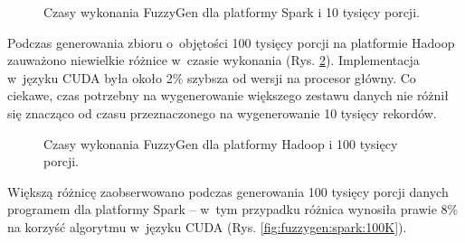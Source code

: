 \begin{figure}[h]
    \centering
    \caption{Czasy wykonania FuzzyGen dla platformy Spark i 10 tysięcy porcji.}
    \label{fig:fuzzygen:spark:10K}
\end{figure}

Podczas generowania zbioru o~objętości 100 tysięcy porcji na platformie Hadoop zauważono niewielkie
różnice w~czasie wykonania (Rys. \ref{fig:fuzzygen:hadoop:100K}). Implementacja w~języku CUDA była
około 2\% szybsza od wersji na procesor główny. Co ciekawe, czas potrzebny na wygenerowanie większego
zestawu danych nie różnił się znacząco od czasu przeznaczonego na wygenerowanie 10 tysięcy rekordów.

\begin{figure}[h!]
    \centering
    \caption{Czasy wykonania FuzzyGen dla platformy Hadoop i 100 tysięcy porcji.}
    \label{fig:fuzzygen:hadoop:100K}
\end{figure}

Większą różnicę zaobserwowano podczas generowania 100 tysięcy porcji danych programem dla platformy Spark
-- w~tym przypadku różnica wynosiła prawie 8\% na korzyść algorytmu w~języku CUDA (Rys. \ref{fig:fuzzygen:spark:100K}).

